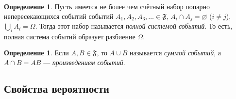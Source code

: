 \documentclass[11pt,openany,a4paper]{scrartcl}
\theoremstyle{plain}
\theoremstyle{definition}
\newtheorem{definition}[theorem]{Определение}
\begin{document}
\begin{definition}
    Пусть имеется не более чем счётный набор попарно непересекающихся событий событий
    $A_1, A_2, A_3, \ldots \in \mathfrak F$, $A_i \cap A_j = \varnothing$ ($i \neq j$),
    $\bigcup\limits_i A_i = \Omega$. Тогда этот набор называется \emph{полной системой событий}.
    То есть, полная система событий образует разбиение $\Omega$.
\end{definition}
\begin{definition}
    Если $A, B \in \mathfrak F$, то $A \cup B$ называется \emph{суммой событий}, а
    $A \cap B = AB$ — \emph{произведением событий}.
\end{definition}

\subsection{Свойства вероятности}
\end{document}

